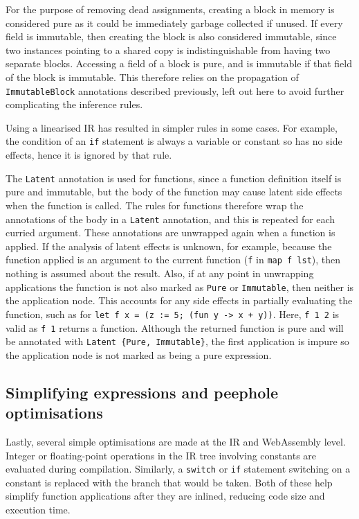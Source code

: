 For the purpose of removing dead assignments, creating a block in memory is considered pure as it could be immediately garbage collected if unused. If every field is immutable, then creating the block is also considered immutable, since two instances pointing to a shared copy is indistinguishable from having two separate blocks. Accessing a field of a block is pure, and is immutable if that field of the block is immutable. This therefore relies on the propagation of \verb|ImmutableBlock| annotations described previously, left out here to avoid further complicating the inference rules.

Using a linearised IR has resulted in simpler rules in some cases. For example, the condition of an \verb|if| statement is always a variable or constant so has no side effects, hence it is ignored by that rule.

The \verb|Latent| annotation is used for functions, since a function definition itself is pure and immutable, but the body of the function may cause latent side effects when the function is called. The rules for functions therefore wrap the annotations of the body in a \verb|Latent| annotation, and this is repeated for each curried argument. These annotations are unwrapped again when a function is applied. If the analysis of latent effects is unknown, for example, because the function applied is an argument to the current function (\verb|f| in \verb|map f lst|), then nothing is assumed about the result. Also, if at any point in unwrapping applications the function is not also marked as \verb|Pure| or \verb|Immutable|, then neither is the application node. This accounts for any side effects in partially evaluating the function, such as for \verb|let f x = (z := 5; (fun y -> x + y))|. Here, \verb|f 1 2| is valid as \verb|f 1| returns a function. Although the returned function is pure and will be annotated with \verb|Latent {Pure, Immutable}|, the first application is impure so the application node is not marked as being a pure expression.



\subsection{Simplifying expressions and peephole optimisations}
Lastly, several simple optimisations are made at the IR and WebAssembly level. Integer or floating-point operations in the IR tree involving constants are evaluated during compilation. Similarly, a \verb|switch| or \verb|if| statement switching on a constant is replaced with the branch that would be taken. Both of these help simplify function applications after they are inlined, reducing code size and execution time. 

